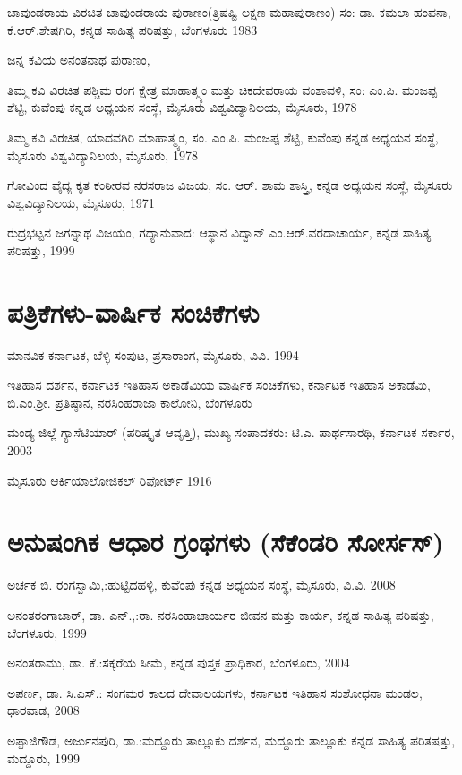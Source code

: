 \noindent
ಚಾವುಂಡರಾಯ ವಿರಚಿತ ಚಾವುಂಡರಾಯ ಪುರಾಣಂ(ತ್ರಿಷಷ್ಟಿ ಲಕ್ಷಣ ಮಹಾಪುರಾಣಂ) ಸಂ: ಡಾ. ಕಮಲಾ ಹಂಪನಾ, ಕೆ.ಆರ್​.ಶೇಷಗಿರಿ, ಕನ್ನಡ ಸಾಹಿತ್ಯ ಪರಿಷತ್ತು, ಬೆಂಗಳೂರು 1983

\noindent
ಜನ್ನ ಕವಿಯ ಅನಂತನಾಥ ಪುರಾಣಂ,

\noindent
ತಿಮ್ಮ ಕವಿ ವಿರಚಿತ ಪಶ್ಚಿಮ ರಂಗ ಕ್ಷೇತ್ರ ಮಾಹಾತ್ಮ್ಯಂ ಮತ್ತು ಚಿಕದೇವರಾಯ ವಂಶಾವಳಿ, ಸಂ: ಎಂ.ಪಿ. ಮಂಜಪ್ಪ ಶೆಟ್ಟಿ, ಕುವೆಂಪು ಕನ್ನಡ ಅಧ್ಯಯನ ಸಂಸ್ಥೆ, ಮೈಸೂರು ವಿಶ್ವವಿದ್ಯಾನಿಲಯ, ಮೈಸೂರು, 1978

\noindent
ತಿಮ್ಮ ಕವಿ ವಿರಚಿತ, ಯಾದವಗಿರಿ ಮಾಹಾತ್ಮ್ಯಂ, ಸಂ. ಎಂ.ಪಿ. ಮಂಜಪ್ಪ ಶೆಟ್ಟಿ, ಕುವೆಂಪು ಕನ್ನಡ ಅಧ್ಯಯನ ಸಂಸ್ಥೆ, ಮೈಸೂರು ವಿಶ್ವವಿದ್ಯಾನಿಲಯ, ಮೈಸೂರು, 1978

\noindent
ಗೋವಿಂದ ವೈದ್ಯ ಕೃತ ಕಂಠೀರವ ನರಸರಾಜ ವಿಜಯ, ಸಂ. ಆರ್​. ಶಾಮ ಶಾಸ್ತ್ರಿ, ಕನ್ನಡ ಅಧ್ಯಯನ ಸಂಸ್ಥೆ, ಮೈಸೂರು ವಿಶ್ವವಿದ್ಯಾನಿಲಯ, ಮೈಸೂರು, 1971

\noindent
ರುದ್ರಭಟ್ಟನ ಜಗನ್ನಾಥ ವಿಜಯಂ, ಗದ್ಯಾನುವಾದ: ಆಸ್ಥಾನ ವಿದ್ವಾನ್​ ಎಂ.ಆರ್​.ವರದಾಚಾರ್ಯ, ಕನ್ನಡ ಸಾಹಿತ್ಯ ಪರಿಷತ್ತು, 1999


\section*{ಪತ್ರಿಕೆಗಳು-ವಾರ್ಷಿಕ ಸಂಚಿಕೆಗಳು}

\noindent
ಮಾನವಿಕ ಕರ್ನಾಟಕ, ಬೆಳ್ಳಿ ಸಂಪುಟ, ಪ್ರಸಾರಾಂಗ, ಮೈಸೂರು, ವಿವಿ. 1994

\noindent
ಇತಿಹಾಸ ದರ್ಶನ, ಕರ್ನಾಟಕ ಇತಿಹಾಸ ಅಕಾಡೆಮಿಯ ವಾರ್ಷಿಕ ಸಂಚಿಕೆಗಳು, ಕರ್ನಾಟಕ ಇತಿಹಾಸ ಅಕಾಡೆಮಿ, ಬಿ.ಎಂ.ಶ‍್ರೀ. ಪ್ರತಿಷ್ಠಾನ, ನರಸಿಂಹರಾಜಾ ಕಾಲೋನಿ, ಬೆಂಗಳೂರು

\noindent
ಮಂಡ್ಯ ಜಿಲ್ಲೆ ಗ್ಯಾಸೆಟಿಯಾರ್​ (ಪರಿಷ್ಕೃತ ಆವೃತ್ತಿ), ಮುಖ್ಯ ಸಂಪಾದಕರು: ಟಿ.ಎ. ಪಾರ್ಥಸಾರಥಿ, ಕರ್ನಾಟಕ ಸರ್ಕಾರ, 2003

\noindent
ಮೈಸೂರು ಆರ್ಕಿಯಾಲೋಜಿಕಲ್​ ರಿಪೋರ್ಟ್ 1916


\section*{ಅನುಷಂಗಿಕ ಆಧಾರ ಗ್ರಂಥಗಳು (ಸೆಕೆಂಡರಿ ಸೋರ್ಸಸ್​)}

\noindent
ಅರ್ಚಕ ಬಿ. ರಂಗಸ್ವಾಮಿ,:ಹುಟ್ಟಿದಹಳ್ಳಿ, ಕುವೆಂಪು ಕನ್ನಡ ಅಧ್ಯಯನ ಸಂಸ್ಥೆ, ಮೈಸೂರು, ವಿ.ವಿ. 2008

\noindent
ಅನಂತರಂಗಾಚಾರ್​, ಡಾ. ಎನ್​.,:ರಾ. ನರಸಿಂಹಾಚಾರ್ಯರ ಜೀವನ ಮತ್ತು ಕಾರ್ಯ, ಕನ್ನಡ ಸಾಹಿತ್ಯ ಪರಿಷತ್ತು, ಬೆಂಗಳೂರು, 1999

\noindent
ಅನಂತರಾಮು, ಡಾ. ಕೆ.:ಸಕ್ಕರೆಯ ಸೀಮೆ, ಕನ್ನಡ ಪುಸ್ತಕ ಪ್ರಾಧಿಕಾರ, ಬೆಂಗಳೂರು, 2004

\noindent
ಅಪರ್ಣ, ಡಾ. ಸಿ.ಎಸ್​.: ಸಂಗಮರ ಕಾಲದ ದೇವಾಲಯಗಳು, ಕರ್ನಾಟಕ ಇತಿಹಾಸ ಸಂಶೋಧನಾ ಮಂಡಲ, ಧಾರವಾಡ, 2008

\noindent
ಅಪ್ಪಾಜಿಗೌಡ, ಅರ್ಜುನಪುರಿ, ಡಾ.:ಮದ್ದೂರು ತಾಲ್ಲೂಕು ದರ್ಶನ, ಮದ್ದೂರು ತಾಲ್ಲೂಕು ಕನ್ನಡ ಸಾಹಿತ್ಯ ಪರಿತಷತ್ತು, ಮದ್ದೂರು, 1999

